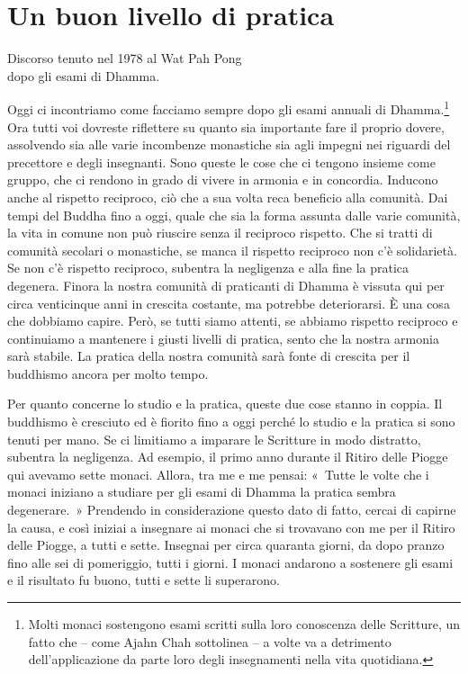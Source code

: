 \chapter{Un buon livello di pratica}

\begin{openingQuote}
  \centering

  Discorso tenuto nel 1978 al Wat Pah Pong\\
  dopo gli esami di Dhamma.
\end{openingQuote}

Oggi ci incontriamo come facciamo sempre dopo gli esami annuali di
Dhamma.\footnote{Molti monaci sostengono esami scritti sulla loro
  conoscenza delle Scritture, un fatto che -- come Ajahn Chah sottolinea
  -- a volte va a detrimento dell'applicazione da parte loro degli
  insegnamenti nella vita quotidiana.} Ora tutti voi dovreste riflettere
su quanto sia importante fare il proprio dovere, assolvendo sia alle
varie incombenze monastiche sia agli impegni nei riguardi del precettore
e degli insegnanti. Sono queste le cose che ci tengono insieme come
gruppo, che ci rendono in grado di vivere in armonia e in concordia.
Inducono anche al rispetto reciproco, ciò che a sua volta reca beneficio
alla comunità. Dai tempi del Buddha fino a oggi, quale che sia la forma
assunta dalle varie comunità, la vita in comune non può riuscire senza
il reciproco rispetto. Che si tratti di comunità secolari o monastiche,
se manca il rispetto reciproco non c'è solidarietà. Se non c'è rispetto
reciproco, subentra la negligenza e alla fine la pratica degenera.
Finora la nostra comunità di praticanti di Dhamma è vissuta qui per
circa venticinque anni in crescita costante, ma potrebbe deteriorarsi. È
una cosa che dobbiamo capire. Però, se tutti siamo attenti, se abbiamo
rispetto reciproco e continuiamo a mantenere i giusti livelli di
pratica, sento che la nostra armonia sarà stabile. La pratica della
nostra comunità sarà fonte di crescita per il buddhismo ancora per molto
tempo.

Per quanto concerne lo studio e la pratica, queste due cose stanno in
coppia. Il buddhismo è cresciuto ed è fiorito fino a oggi perché lo
studio e la pratica si sono tenuti per mano. Se ci limitiamo a imparare
le Scritture in modo distratto, subentra la negligenza. Ad esempio, il
primo anno durante il Ritiro delle Piogge qui avevamo sette monaci.
Allora, tra me e me pensai: «~Tutte le volte che i monaci iniziano a
studiare per gli esami di Dhamma la pratica sembra degenerare.~»
Prendendo in considerazione questo dato di fatto, cercai di capirne la
causa, e così iniziai a insegnare ai monaci che si trovavano con me per
il Ritiro delle Piogge, a tutti e sette. Insegnai per circa quaranta
giorni, da dopo pranzo fino alle sei di pomeriggio, tutti i giorni. I
monaci andarono a sostenere gli esami e il risultato fu buono, tutti e
sette li superarono.

